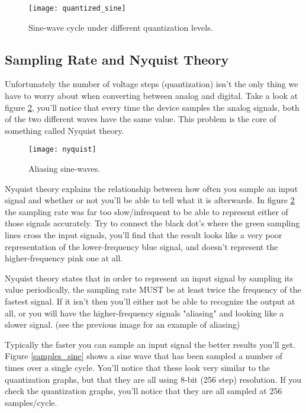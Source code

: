 \documentclass[11pt,fleqn]{book} %
\begin{document}
\begin{figure}[]
    \centering\texttt{[image: quantized\_sine]}
    \caption{Sine-wave cycle under different quantization levels.}
    \label{quantized_sine}
\end{figure}

\subsection{Sampling Rate and Nyquist Theory}
Unfortunately the number of voltage steps (quantization) isn't the only thing we have to worry about when converting between analog and digital. Take a look at figure \ref{nyquist}, you'll notice that every time the device samples the analog signals, both of the two different waves have the same value. This problem is the core of something called Nyquist theory.

\begin{figure}[]
    \centering\texttt{[image: nyquist]}
    \caption{Aliasing sine-waves.}
    \label{nyquist}
\end{figure}

Nyquist theory explains the relationship between how often you sample an input signal and whether or not you'll be able to tell what it is afterwards. In figure \ref{nyquist} the sampling rate was far too slow/infrequent to be able to represent either of those signals accurately. Try to connect the black dot's where the green sampling lines cross the input signals, you'll find that the result looks like a very poor representation of the lower-frequency blue signal, and doesn't represent the higher-frequency pink one at all. 

Nyquist theory states that in order to represent an input signal by sampling its value periodically, the sampling rate MUST be at least twice the frequency of the fastest signal. If it isn't then you'll either not be able to recognize the output at all, or you will have the higher-frequency signals "aliasing" and looking like a slower signal. (see the previous image for an example of aliasing) 

Typically the faster you can sample an input signal the better results you'll get. Figure \ref{samples_sine} shows a sine wave that has been sampled a number of times over a single cycle. You'll notice that these look very similar to the quantization graphs, but that they are all using 8-bit (256 step) resolution. If you check the quantization graphs, you'll notice that they are all sampled at 256 samples/cycle. 
\end{document}
